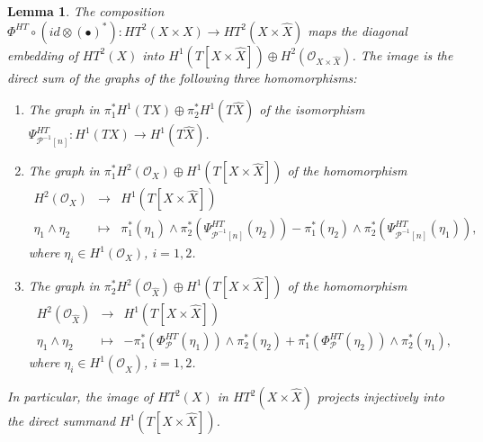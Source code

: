 \documentclass[12pt]{amsart}
\numberwithin{equation}{subsection}
\theoremstyle{plain}
\newtheorem{lem}[thm]{Lemma}
\theoremstyle{definition}
\renewcommand{\P}{{\mathcal P}}
\newcommand{\StructureSheaf}[1]{{\mathcal O}_{#1}}
\begin{document}
\begin{lem}
\label{lemma-Orlov's-equivalence-maps-diagonal-deformations-to-commutative-gerby-ones}
The composition 
$\Phi^{HT}\circ (id\otimes (\bullet)^*):HT^2(X\times X)\rightarrow HT^2(X\times\hat{X})$
maps the diagonal embedding of $HT^2(X)$ into $H^1(T[X\times\hat{X}])\oplus H^2(\StructureSheaf{X\times\hat{X}})$.
The image is the direct sum of the graphs of the following three homomorphisms: 
\begin{enumerate}
\item The graph in $\pi_1^*H^1(TX)\oplus \pi_2^*H^1(T\hat{X})$ of the isomorphism 
$\Psi_{\P^{-1}[n]}^{HT}:H^1(TX)\rightarrow H^1(T\hat{X})$.
\item
The graph in $\pi_1^*H^2(\StructureSheaf{X}) \oplus H^1(T[X\times\hat{X}])$
of the homomorphism 
\begin{eqnarray*}
H^2(\StructureSheaf{X})&\rightarrow& H^1(T[X\times\hat{X}])
\\
\eta_1\wedge\eta_2&\mapsto&\pi_1^*(\eta_1)\wedge\pi_2^*(\Psi_{\P^{-1}[n]}^{HT}(\eta_2))-\pi_1^*(\eta_2)\wedge\pi_2^*(\Psi_{\P^{-1}[n]}^{HT}(\eta_1)),
\end{eqnarray*}
where $\eta_i\in H^1(\StructureSheaf{X})$, $i=1,2$.
\item
The graph in $\pi_2^*H^2(\StructureSheaf{\hat{X}})\oplus H^1(T[X\times\hat{X}])$
of the homomorphism
\begin{eqnarray*}
H^2(\StructureSheaf{\hat{X}})&\rightarrow &H^1(T[X\times\hat{X}])
\\
\eta_1\wedge\eta_2&\mapsto& 
-\pi_1^*(\Phi_\P^{HT}(\eta_1))\wedge\pi_2^*(\eta_2)+\pi_1^*(\Phi_\P^{HT}(\eta_2))\wedge\pi_2^*(\eta_1),
\end{eqnarray*}
where $\eta_i\in H^1(\StructureSheaf{\hat{X}})$, $i=1,2$.
\end{enumerate}
In particular, the image of $HT^2(X)$ in $HT^2(X\times\hat{X})$ projects injectively into the direct summand $H^1(T[X\times\hat{X}])$.
\end{lem}
\end{document}
